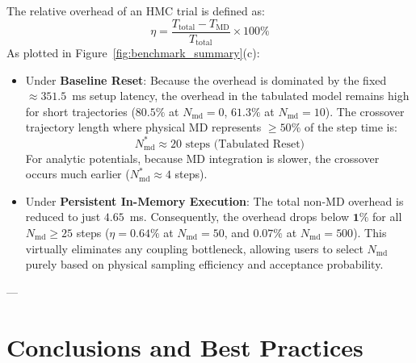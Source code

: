 \documentclass[11pt,a4paper]{article}
\begin{document}
The relative overhead of an HMC trial is defined as:
\begin{equation}
\eta = \frac{T_{\mathrm{total}} - T_{\mathrm{MD}}}{T_{\mathrm{total}}} \times 100\%
\end{equation}
As plotted in Figure~\ref{fig:benchmark_summary}(c):
\begin{itemize}
    \item Under \textbf{Baseline Reset}: Because the overhead is dominated by the fixed $\approx 351.5$~ms setup latency, the overhead in the tabulated model remains high for short trajectories ($80.5\%$ at $N_{\mathrm{md}} = 0$, $61.3\%$ at $N_{\mathrm{md}} = 10$). The crossover trajectory length where physical MD represents $\ge 50\%$ of the step time is:
    \begin{equation}
    N_{\mathrm{md}}^* \approx 20 \text{ steps (Tabulated Reset)}
    \end{equation}
    For analytic potentials, because MD integration is slower, the crossover occurs much earlier ($N_{\mathrm{md}}^* \approx 4$ steps).
    \item Under \textbf{Persistent In-Memory Execution}: The total non-MD overhead is reduced to just $4.65$~ms. Consequently, the overhead drops below $\mathbf{1\%}$ for all $N_{\mathrm{md}} \ge 25$ steps ($\eta = 0.64\%$ at $N_{\mathrm{md}} = 50$, and $0.07\%$ at $N_{\mathrm{md}} = 500$). This virtually eliminates any coupling bottleneck, allowing users to select $N_{\mathrm{md}}$ purely based on physical sampling efficiency and acceptance probability.
\end{itemize}

---

\section{Conclusions and Best Practices}
\end{document}
